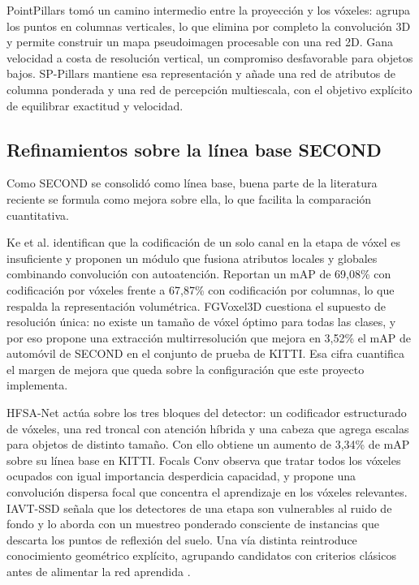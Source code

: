 \documentclass[11pt,letterpaper]{article}
\begin{document}
PointPillars \cite{lang2019} tomó un camino intermedio entre la proyección y los vóxeles: agrupa los puntos en columnas verticales, lo que elimina por completo la convolución 3D y permite construir un mapa pseudoimagen procesable con una red 2D. Gana velocidad a costa de resolución vertical, un compromiso desfavorable para objetos bajos. SP-Pillars \cite{chen2025sp} mantiene esa representación y añade una red de atributos de columna ponderada y una red de percepción multiescala, con el objetivo explícito de equilibrar exactitud y velocidad.

\subsection{Refinamientos sobre la línea base SECOND}

Como SECOND se consolidó como línea base, buena parte de la literatura reciente se formula como mejora sobre ella, lo que facilita la comparación cuantitativa.

Ke et al. \cite{ke2025} identifican que la codificación de un solo canal en la etapa de vóxel es insuficiente y proponen un módulo que fusiona atributos locales y globales combinando convolución con autoatención. Reportan un mAP de 69,08\% con codificación por vóxeles frente a 67,87\% con codificación por columnas, lo que respalda la representación volumétrica. FGVoxel3D \cite{ao2026} cuestiona el supuesto de resolución única: no existe un tamaño de vóxel óptimo para todas las clases, y por eso propone una extracción multirresolución que mejora en 3,52\% el mAP de automóvil de SECOND en el conjunto de prueba de KITTI. Esa cifra cuantifica el margen de mejora que queda sobre la configuración que este proyecto implementa.

HFSA-Net \cite{yin2026} actúa sobre los tres bloques del detector: un codificador estructurado de vóxeles, una red troncal con atención híbrida y una cabeza que agrega escalas para objetos de distinto tamaño. Con ello obtiene un aumento de 3,34\% de mAP sobre su línea base en KITTI. Focals Conv \cite{chen2022b} observa que tratar todos los vóxeles ocupados con igual importancia desperdicia capacidad, y propone una convolución dispersa focal que concentra el aprendizaje en los vóxeles relevantes. IAVT-SSD \cite{wang2025iavt} señala que los detectores de una etapa son vulnerables al ruido de fondo y lo aborda con un muestreo ponderado consciente de instancias que descarta los puntos de reflexión del suelo. Una vía distinta reintroduce conocimiento geométrico explícito, agrupando candidatos con criterios clásicos antes de alimentar la red aprendida \cite{shi2025}.
\end{document}
